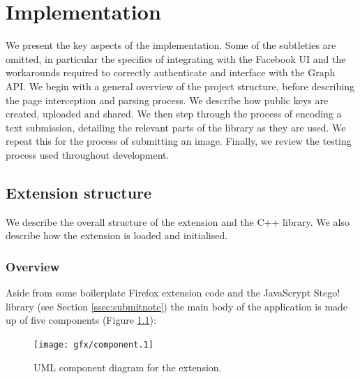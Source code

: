 \chapter{Implementation}\label{ch:implementation}

We present the key aspects of the implementation. Some of the subtleties are omitted, in particular the specifics of integrating with the Facebook UI and the workarounds required to correctly authenticate and interface with the Graph API. We begin with a general overview of the project structure, before describing the page interception and parsing process. We describe how public keys are created, uploaded and shared. We then step through the process of encoding a text submission, detailing the relevant parts of the library as they are used. We repeat this for the process of submitting an image. Finally, we review the testing process used throughout development.


\FloatBarrier
\section{Extension structure}

We describe the overall structure of the extension and the C++ library. We also describe how the extension is loaded and initialised.

\subsection{Overview}

    Aside from some boilerplate Firefox extension code and the JavaScrypt Stego! library (see Section \ref{ssec:submitnote}) the main body of the application is made up of five components (Figure \ref{uml:component}):

    \begin{figure}[tb]
        \begin{center}
                \texttt{[image: gfx/component.1]}
            \caption{UML component diagram for the extension.}
            \label{uml:component}
        \end{center}
    \end{figure}
    
